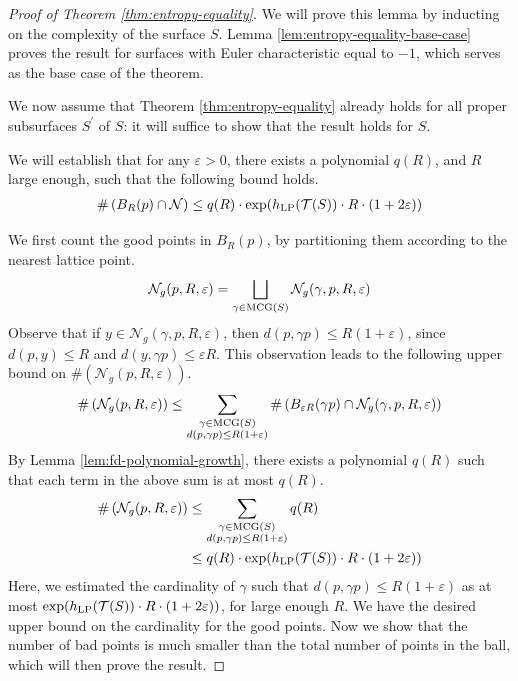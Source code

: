 \documentclass[12pt, reqno]{amsart}
\begin{document}
\begin{proof}[Proof of Theorem \ref{thm:entropy-equality}]
  We will prove this lemma by inducting on the complexity of the surface $S$.
  Lemma \ref{lem:entropy-equality-base-case} proves the result for surfaces with Euler characteristic equal to $-1$, which serves as the base case of the theorem.

  We now assume that Theorem \ref{thm:entropy-equality} already holds for all proper subsurfaces $S^{\prime}$ of $S$: it will suffice to show that the result holds for $S$.

  We will establish that for any $\varepsilon > 0$, there exists a polynomial $q(R)$, and $R$ large enough, such that the following bound holds.
  \begin{align*}
    \#\left( B_R(p) \cap \mathcal{N} \right) \leq q(R) \cdot \exp(h_{\mathrm{LP}}(\mathcal{T}(S)) \cdot R \cdot (1 + 2 \varepsilon))
  \end{align*}

  We first count the good points in $B_R(p)$, by partitioning them according to the nearest lattice point.
  \begin{align}
    \label{eq:good-point-partition}
    \mathcal{N}_g(p, R, \varepsilon) = \bigsqcup_{\gamma \in \mathrm{MCG}(S)} \mathcal{N}_g(\gamma, p, R, \varepsilon)
  \end{align}
  Observe that if $y \in \mathcal{N}_g(\gamma, p, R, \varepsilon)$, then $d(p, \gamma p) \leq R(1 + \varepsilon)$, since $d(p, y) \leq R$ and $d(y, \gamma p) \leq \varepsilon R$.
  This observation leads to the following upper bound on $\#\left( \mathcal{N}_g(p, R, \varepsilon) \right)$.
  \begin{align}
    \#\left( \mathcal{N}_g(p, R, \varepsilon) \right) \leq \sum_{\substack{\gamma \in \mathrm{MCG}(S) \\ d(p, \gamma p) \leq R(1 + \varepsilon)}} \#\left( B_{\varepsilon R}(\gamma p) \cap \mathcal{N}_g(\gamma, p, R, \varepsilon)  \right) \label{eq:good-estimate-1}
  \end{align}
  By Lemma \ref{lem:fd-polynomial-growth}, there exists a polynomial $q(R)$ such that each term in the above sum is at most $q(R)$.
  \begin{align}
    \#\left( \mathcal{N}_g(p, R, \varepsilon) \right) &\leq \sum_{\substack{\gamma \in \mathrm{MCG}(S) \\ d(p, \gamma p) \leq R(1 + \varepsilon)}} q(R) \\
     &\leq q(R) \cdot \exp(h_{\mathrm{LP}}(\mathcal{T}(S)) \cdot R \cdot (1 + 2 \varepsilon))
    \label{eq:good-estimate-2}
  \end{align}
  Here, we estimated the cardinality of $\gamma$ such that $d(p, \gamma p) \leq R(1+\varepsilon)$ as at most $\exp(h_{\mathrm{LP}}(\mathcal{T}(S)) \cdot R \cdot (1 + 2 \varepsilon))$, for large enough $R$.
  We have the desired upper bound on the cardinality for the good points.
  Now we show that the number of bad points is much smaller than the total number of points in the ball, which will then prove the result.


\end{proof}
\end{document}
